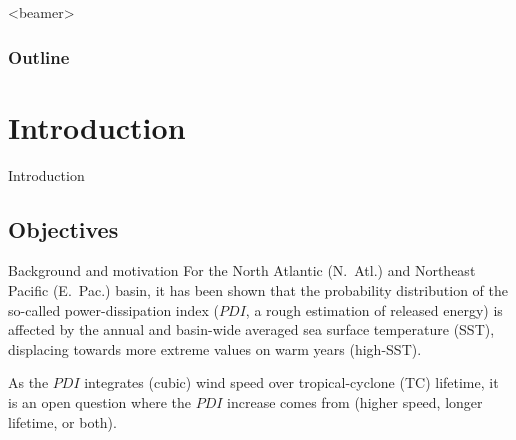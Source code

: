 \frame{\maketitle}


\begin{frame}<beamer>
	\frametitle{Outline}
	\tableofcontents%
\end{frame}

\section{Introduction}
\begin{darkframes}
	\begin{frame}
		\huge Introduction
	\end{frame}
\end{darkframes}

\subsection{Objectives}
\begin{frame}[label=intro-motivation]{Background and motivation}
	For the North Atlantic (N.~Atl.) and Northeast Pacific (E.~Pac.) basin, it has been shown \cite{Corral2010} that the probability distribution of the so-called power-dissipation index ($PDI$, a rough estimation of released energy) is affected by the annual and basin-wide averaged sea surface temperature (SST), displacing towards more extreme values on warm years (high-SST).

	\medskip
	As the $PDI$ integrates (cubic) wind speed over tropical-cyclone (TC) lifetime, it is an open question where the $PDI$ increase comes from (higher speed, longer lifetime, or both).
\end{frame}

